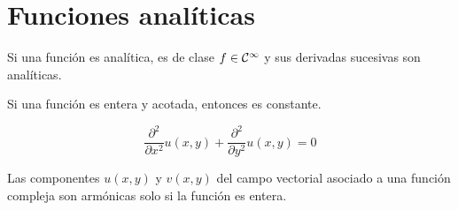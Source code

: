 \section{Funciones analíticas}

\begin{mdframed}[style=DefinitionFrame]
    \begin{defn}
    \end{defn}
\end{mdframed}

\begin{mdframed}[style=PropertyFrame]
    \begin{prop}
    \end{prop}
    Si una función es analítica, es de clase $f \in \class[\infty]$ y sus derivadas sucesivas son analíticas.
\end{mdframed}

\begin{mdframed}[style=PropertyFrame]
    \begin{defn}
    \end{defn}
\end{mdframed}

\begin{mdframed}[style=PropertyFrame]
    \begin{prop}
    \end{prop}
    Si una función es entera y acotada, entonces es constante.
\end{mdframed}

\begin{mdframed}[style=PropertyFrame]
    \begin{defn}
    \end{defn}
    \begin{equation*}
        \frac{\partial^2}{\partial x^2} u(x,y) + \frac{\partial^2}{\partial y^2} u(x,y) = 0
    \end{equation*}
\end{mdframed}

\begin{mdframed}[style=PropertyFrame]
    \begin{prop}
    \end{prop}
    Las componentes $u(x,y)$ y $v(x,y)$ del campo vectorial asociado a una función compleja son armónicas solo si la función es entera.
\end{mdframed}

